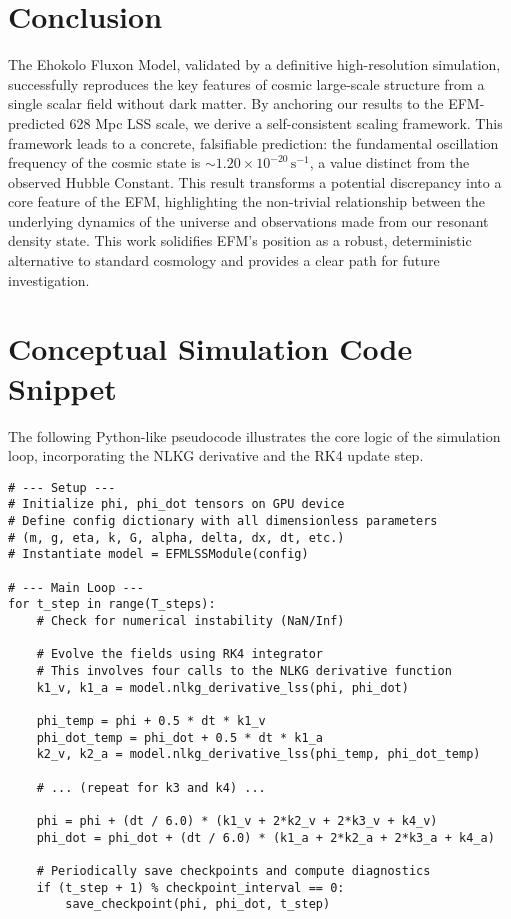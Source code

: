 \documentclass[11pt]{article}
\begin{document}
\section{Conclusion}
The Ehokolo Fluxon Model, validated by a definitive high-resolution simulation, successfully reproduces the key features of cosmic large-scale structure from a single scalar field without dark matter. By anchoring our results to the EFM-predicted 628 Mpc LSS scale, we derive a self-consistent scaling framework. This framework leads to a concrete, falsifiable prediction: the fundamental oscillation frequency of the cosmic state is \(\sim 1.20 \times 10^{-20} \, \text{s}^{-1}\), a value distinct from the observed Hubble Constant. This result transforms a potential discrepancy into a core feature of the EFM, highlighting the non-trivial relationship between the underlying dynamics of the universe and observations made from our resonant density state. This work solidifies EFM's position as a robust, deterministic alternative to standard cosmology and provides a clear path for future investigation.

\appendix
\section{Conceptual Simulation Code Snippet}
The following Python-like pseudocode illustrates the core logic of the simulation loop, incorporating the NLKG derivative and the RK4 update step.

\begin{lstlisting}[caption={Conceptual Simulation Logic for EFM LSS}, label=lst:lss_code]
# --- Setup ---
# Initialize phi, phi_dot tensors on GPU device
# Define config dictionary with all dimensionless parameters
# (m, g, eta, k, G, alpha, delta, dx, dt, etc.)
# Instantiate model = EFMLSSModule(config)

# --- Main Loop ---
for t_step in range(T_steps):
    # Check for numerical instability (NaN/Inf)
    
    # Evolve the fields using RK4 integrator
    # This involves four calls to the NLKG derivative function
    k1_v, k1_a = model.nlkg_derivative_lss(phi, phi_dot)
    
    phi_temp = phi + 0.5 * dt * k1_v
    phi_dot_temp = phi_dot + 0.5 * dt * k1_a
    k2_v, k2_a = model.nlkg_derivative_lss(phi_temp, phi_dot_temp)
    
    # ... (repeat for k3 and k4) ...
    
    phi = phi + (dt / 6.0) * (k1_v + 2*k2_v + 2*k3_v + k4_v)
    phi_dot = phi_dot + (dt / 6.0) * (k1_a + 2*k2_a + 2*k3_a + k4_a)
    
    # Periodically save checkpoints and compute diagnostics
    if (t_step + 1) % checkpoint_interval == 0:
        save_checkpoint(phi, phi_dot, t_step)
\end{lstlisting}
\end{document}
